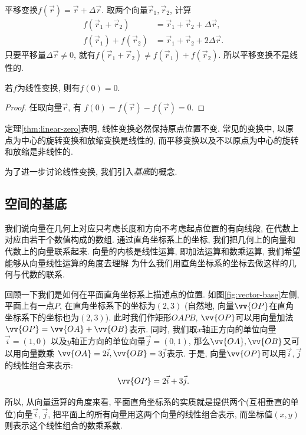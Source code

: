 \begin{example}
  平移变换$f(\vec r) = \vec r+\Delta{\vec r}$.
  取两个向量$\vec r_1,\vec r_2$, 计算
  \begin{align*}
    f(\vec r_1 + \vec r_2)
     & = \vec r_1 + \vec r_2 + \Delta{\vec r},  \\
    f(\vec r_1) + f(\vec r_2)
     & = \vec r_1 + \vec r_2 + 2\Delta{\vec r}.
  \end{align*}
  只要平移量$\Delta{\vec r}\neq0$,
  就有$f(\vec r_1 + \vec r_2) \neq f(\vec r_1) + f(\vec r_2)$.
  所以平移变换不是线性的.
\end{example}

\begin{theorem}\label{thm:linear-zero}
  若$f$为线性变换, 则有$f(0) = 0$.
\end{theorem}
\begin{proof}
  任取向量$\vec r$, 有
  $f(0) = f(\vec r) - f(\vec r) = 0$.
\end{proof}

定理\ref{thm:linear-zero}表明,
线性变换必然保持原点位置不变.
常见的变换中, 以原点为中心的旋转变换和放缩变换是线性的,
而平移变换以及不以原点为中心的旋转和放缩是非线性的.

为了进一步讨论线性变换, 我们引入\emph{基底}的概念.

\subsection{空间的基底}

我们说向量在几何上对应只考虑长度和方向不考虑起点位置的有向线段,
在代数上对应由若干个数值构成的数组.
通过直角坐标系上的坐标, 我们把几何上的向量和代数上的向量联系起来.
向量的内核是线性运算, 即加法运算和数乘运算,
我们希望能够从向量线性运算的角度去理解
为什么我们用直角坐标系的坐标去做这样的几何与代数的联系.

回顾一下我们是如何在平面直角坐标系上描述点的位置.
如图\ref{fig:vector-base}左侧,
平面上有一点$P$, 在直角坐标系下的坐标为$(2,3)$
(自然地, 向量$\vv{OP}$在直角坐标系下的坐标也为$(2,3)$).
此时我们作矩形$OAPB$,
$\vv{OP}$可以用向量加法$\vv{OP} = \vv{OA} + \vv{OB}$表示.
同时, 我们取$x$轴正方向的单位向量$\vec i=(1,0)$
以及$y$轴正方向的单位向量$\vec j=(0,1)$,
那么$\vv{OA},\vv{OB}$又可以用向量数乘
$\vv{OA}=2\vec i,\vv{OB}=3\vec j$表示.
于是, 向量$\vv{OP}$可以用$\vec i,\vec j$的线性组合来表示:
\[\vv{OP} = 2\vec i + 3\vec j.\]

所以, 从向量运算的角度来看,
平面直角坐标系的实质就是提供两个(互相垂直的单位)向量$\vec i,\vec j$,
把平面上的所有向量用这两个向量的线性组合表示,
而坐标值$(x,y)$则表示这个线性组合的数乘系数.

